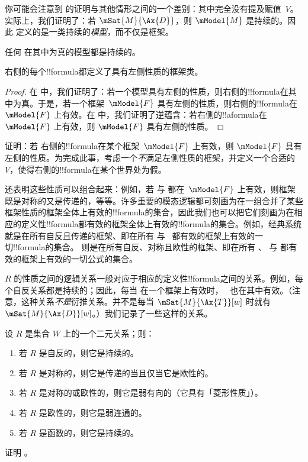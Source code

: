 \documentclass[../../../include/open-logic-section]{subfiles}
\begin{document}
你可能会注意到  的证明与其他情形之间的一个差别：其中完全没有提及赋值~$V$。实际上，我们证明了：若 $\mSat{M}{\Ax{D}}$，则 $\mModel{M}$ 是持续的。因此  定义的是一类持续的\emph{模型}，而不仅是框架。

\begin{cor}
  任何  在其中为真的模型都是持续的。
\end{cor}

\begin{cor}
 右侧的每个!!{formula}都定义了具有左侧性质的框架类。
\end{cor}

\begin{proof}
  在  中，我们证明了：若一个模型具有左侧的性质，则右侧的!!{formula}在其中为真。于是，若一个框架~$\mModel{F}$ 具有左侧的性质，则右侧的!!{formula}在~$\mModel{F}$ 上有效。在  中，我们证明了逆蕴含：若右侧的!!a{formula}在~$\mModel{F}$ 上有效，则 $\mModel{F}$ 具有左侧的性质。
\end{proof}

\begin{prob}
证明：若  右侧的!!{formula}在某个框架~$\mModel{F}$ 上有效，则 $\mModel{F}$ 具有左侧的性质。为完成此事，考虑一个\emph{不}满足左侧性质的框架，并定义一个合适的~$V$，使得右侧的!!{formula}在某个世界处为假。
\end{prob}

 还表明这些性质可以组合起来：例如，若  与  都在~$\mModel{F}$ 上有效，则框架既是对称的又是传递的，等等。许多重要的模态逻辑都可刻画为在一组合并了某些框架性质的框架全体上有效的!!{formula}的集合，因此我们也可以把它们刻画为在相应的定义性!!{formula}都有效的框架全体上有效的!!{formula}的集合。例如，经典系统  就是在所有自反且传递的框架、即在所有  与~ 都有效的框架上有效的一切!!{formula}的集合。 则是在所有自反、对称且欧性的框架、即在所有 、 与  都有效的框架上有效的一切公式的集合。

$R$ 的性质之间的逻辑关系一般对应于相应的定义性!!{formula}之间的关系。例如，每个自反关系都是持续的；因此，每当  在一个框架上有效时，~ 也在其中有效。（注意，这种关系\emph{不是}衍推关系。并不是每当 $\mSat{M}{\Ax{T}}[w]$ 时就有 $\mSat{M}{\Ax{D}}[w]$。）我们记录了一些这样的关系。

\begin{prop}
  设 $R$ 是集合 $W$ 上的一个二元关系；则：
  \begin{enumerate}
  \item 若 $R$ 是自反的，则它是持续的。
  \item 若 $R$ 是对称的，则它是传递的当且仅当它是欧性的。
  \item 若 $R$ 是对称的或欧性的，则它是弱有向的（它具有「菱形性质」）。
  \item 若 $R$ 是欧性的，则它是弱连通的。
  \item 若 $R$ 是函数的，则它是持续的。
  \end{enumerate}
\end{prop}

\begin{prob}
  证明 。
\end{prob}
\end{document}
